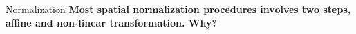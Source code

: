 \documentclass{beamer}
\begin{document}
%     
% 
%     


\begin{frame}{Normalization}
  \textbf{Most spatial normalization procedures involves two steps, affine and non-linear transformation. Why?}

\end{frame}

% 
\end{document}
